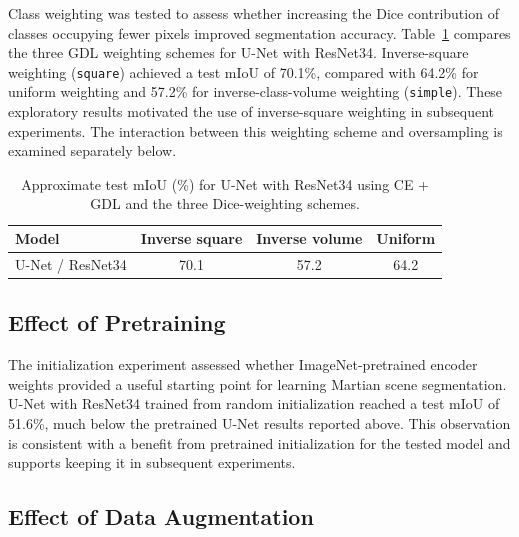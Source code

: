 Class weighting was tested to assess whether increasing the Dice contribution of classes occupying fewer pixels improved segmentation accuracy. Table~\ref{tab:s5mars-exploratory-dice-weighting} compares the three GDL weighting schemes for U-Net with ResNet34. Inverse-square weighting (\texttt{square}) achieved a test mIoU of 70.1\%, compared with 64.2\% for uniform weighting and 57.2\% for inverse-class-volume weighting (\texttt{simple}). These exploratory results motivated the use of inverse-square weighting in subsequent experiments. The interaction between this weighting scheme and oversampling is examined separately below.

\begin{table}[ht!]
    \centering
    \small
    \setlength{\tabcolsep}{5pt}
    \begin{tabular}{@{}l c c c@{}}
        \toprule
        \textbf{Model}   & \textbf{Inverse square} & \textbf{Inverse volume} & \textbf{Uniform} \\
        \midrule
        \midrule
        U-Net / ResNet34 & 70.1                    & 57.2                    & 64.2             \\
        \bottomrule
    \end{tabular}
    \vspace{5mm}
    \caption{Approximate test mIoU (\%) for U-Net with ResNet34 using CE + GDL and the three Dice-weighting schemes.}
    \label{tab:s5mars-exploratory-dice-weighting}
\end{table}

\subsection{Effect of Pretraining}

The initialization experiment assessed whether ImageNet-pretrained encoder weights provided a useful starting point for learning Martian scene segmentation. U-Net with ResNet34 trained from random initialization reached a test mIoU of 51.6\%, much below the pretrained U-Net results reported above. This observation is consistent with a benefit from pretrained initialization for the tested model and supports keeping it in subsequent experiments.

\subsection{Effect of Data Augmentation}

